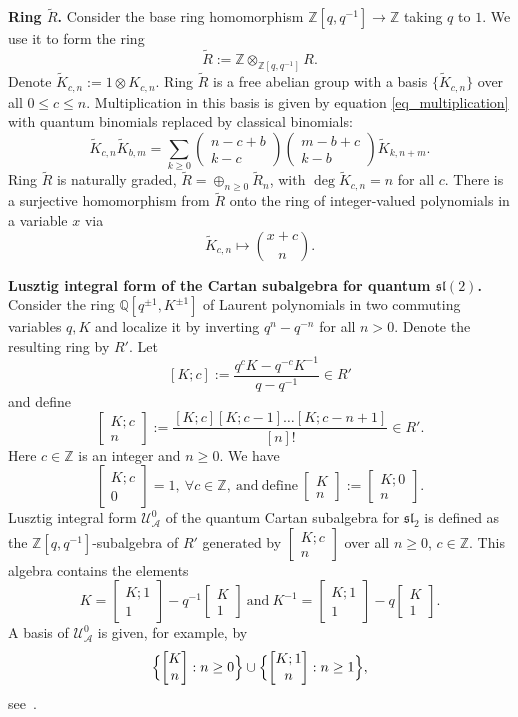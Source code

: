 \documentclass{article}
\def\lra{\longrightarrow}
\def\mf{\mathfrak}
\def\Q{\mathbb Q}
\def\Z{\mathbb Z}
\newcommand{\mcA}{\mathcal{A}}
\newcommand{\wtR}{\widetilde{R}}
\newcommand{\wtK}{\widetilde{K}}
\newcommand{\UzeroA}{\mathcal{U}^0_{\mcA}}
\newcommand{\bbinom}[2]{
  \begin{bmatrix}
    #1 \\
    #2
  \end{bmatrix}
}
\newcommand{\bmat}[3]{
  \begin{bmatrix}
    #1 ; #2 \\
    #3
  \end{bmatrix}
}
\theoremstyle{definition}
\theoremstyle{definition}
\begin{document}
\vspace{0.07in}

{\bf Ring $\wtR$.}
Consider the base ring homomorphism $\Z[q,q^{-1}]\lra \Z$ taking $q$ to $1$. We use it to form the ring
\begin{equation}
    \wtR:= \Z\otimes_{\Z[q,q^{-1}]} R.
\end{equation}
Denote $\wtK_{c,n}:=1\otimes K_{c,n}$. Ring $\wtR$ is a free abelian group with a basis $\{\wtK_{c,n}\}$ over all $0\le c\le n$. Multiplication in this basis is given by equation \eqref{eq_multiplication} with quantum binomials replaced by classical binomials:
\begin{equation}\label{eq_multiplication_cl}
\wtK_{c,n}\wtK_{b,m} = \sum_{k \ge 0} \begin{pmatrix} n - c + b \\ k - c \end{pmatrix} \begin{pmatrix} m - b + c \\ k - b \end{pmatrix}
\wtK_{k,n+m}.
\end{equation}
Ring $\wtR$ is naturally graded, $\wtR=\oplus_{n\ge 0}\wtR_n$, with $\deg \wtK_{c,n}=n$ for all $c$.
There is a surjective homomorphism from $\wtR$ onto the ring of integer-valued polynomials in a variable $x$ via
\[
 \wtK_{c,n}\longmapsto \binom{x+c}{n}.
\]


{\bf Lusztig integral form of the Cartan subalgebra for quantum $\mf{sl}(2)$.}
Consider the ring $\Q[q^{\pm 1},K^{\pm 1}]$ of Laurent polynomials in two commuting variables $q,K$ and localize it by inverting $q^n-q^{-n}$ for all $n>0$. Denote the resulting ring by $R'$.
Let
\begin{equation}\label{eq_Kc1}
[K;c] := \frac{q^c K - q^{-c} K^{-1}}{q-q^{-1}} \in R'
\end{equation}
and define
\begin{equation}\label{eq_Kcn}
\bmat{K}{c}{n} := \frac{[K;c][K;c-1]\dots [K;c-n+1]}{[n]!}\in R'.
\end{equation}
Here $c\in \Z$ is an integer and $n\ge 0$.
We have
\[
\bmat{K}{c}{0}=1, \ \forall c\in\Z, \ \mathrm{and} \ \mathrm{define} \  \bbinom{K}{n}:= \bmat{K}{0}{n}.
\]
Lusztig integral form $\UzeroA$ of the quantum Cartan subalgebra for $\mf{sl}_2$ is defined as the $\Z[q,q^{-1}]$-subalgebra of $R'$ generated by $\bmat{K}{c}{n}$ over all $n\ge 0$, $c\in \Z$. This algebra contains the elements
\begin{equation}\label{eq_K_and_inverse}
K = \bmat{K}{1}{1} - q^{-1}\bbinom{K}{1} \  \mathrm{and} \ K^{-1}= \bmat{K}{1}{1} - q\bbinom{K}{1}.
\end{equation}
A basis of $\UzeroA$ is given, for example, by
\begin{equation}\label{eq_basis_U}
\Bigl\{ \bbinom{K}{n}: n\ge 0 \Bigr\} \cup \Bigl\{ \bmat{K}{1}{n}: n\ge 1 \Bigr\},
\end{equation}
see~\cite[Proposition~5.3]{GMSW1}.
\end{document}
